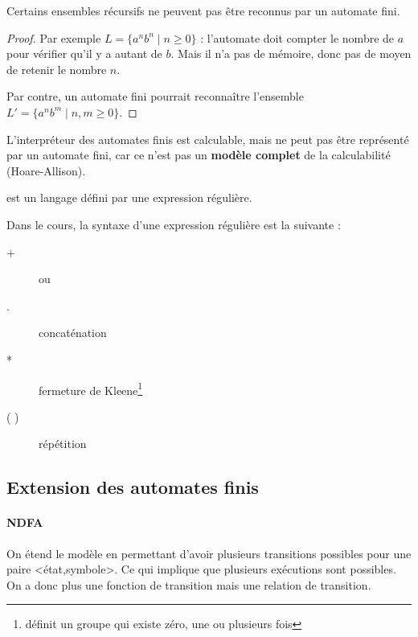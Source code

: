 \begin{myprop}
	Certains ensembles récursifs ne peuvent pas être reconnus par un
	automate fini.

    \begin{proof}
    Par exemple $L = \{ a^n b^n \mid n\geq 0\}$ : l'automate doit compter le nombre de $a$ pour vérifier qu'il y a autant de $b$. Mais il n'a pas de mémoire, donc pas de moyen de retenir le nombre $n$.

    Par contre, un automate fini pourrait reconnaître l'ensemble $L' = \{a^n b^m \mid n,m\geq 0\}$.
    \end{proof}
\end{myprop}

\begin{myprop}
	L'interpréteur des automates finis est calculable, mais ne peut pas être
	représenté par un automate fini, car ce n'est pas un \textbf{modèle
	complet} de la calculabilité (Hoare-Allison).
\end{myprop}

\begin{mydef} est un langage défini par une expression
	régulière.
\end{mydef}

\begin{mydef}
       	Dans le cours, la syntaxe d'une expression régulière est la suivante :
	\begin{description}
		\item[+] ou
		\item[.] concaténation
		\item[*] fermeture de Kleene\footnote{définit un groupe qui existe zéro, une ou plusieurs fois}
		\item[( )] répétition
	\end{description}
\end{mydef}



\subsection{Extension des automates finis}
\label{ssub:automate_fini_nd}
\paragraph{NDFA} On étend le modèle en permettant d'avoir plusieurs transitions possibles pour
une paire <état,symbole>. Ce qui implique que plusieurs exécutions sont
possibles. On a donc plus une fonction de transition mais une relation de transition.

